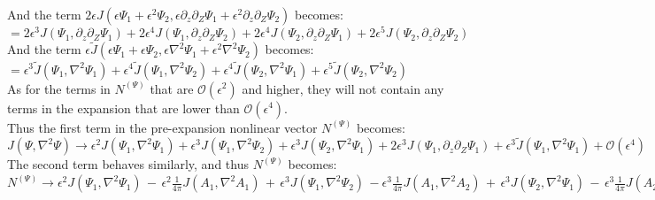 \documentclass[letterpaper,12pt]{article}
\begin{document}
And the term $2\epsilon J(\epsilon\Psi_1 + \epsilon^2\Psi_2, \epsilon\partial_z\partial_Z\Psi_1 + \epsilon^2\partial_z\partial_Z\Psi_2)$ becomes: \\

$= 2\epsilon^3 J(\Psi_1, \partial_z\partial_Z\Psi_1) + 2\epsilon^4 J(\Psi_1, \partial_z\partial_Z\Psi_2) + 2\epsilon^4 J(\Psi_2, \partial_z\partial_Z\Psi_1) + 2\epsilon^5 J(\Psi_2, \partial_z\partial_Z \Psi_2)$ \\

And the term $\epsilon \widetilde{J}(\epsilon\Psi_1 + \epsilon\Psi_2, \epsilon\nabla^2\Psi_1 + \epsilon^2\nabla^2\Psi_2)$ becomes: \\

$= \epsilon^3 \widetilde{J}(\Psi_1, \nabla^2 \Psi_1) + \epsilon^4\widetilde{J}(\Psi_1, \nabla^2\Psi_2) + \epsilon^4\widetilde{J}(\Psi_2, \nabla^2\Psi_1) + \epsilon^5\widetilde{J}(\Psi_2, \nabla^2 \Psi_2)$ \\

As for the terms in $N^{(\Psi)}$ that are $\mathcal{O}(\epsilon^2)$ and higher, they will not contain any terms in the expansion that are lower than $\mathcal{O}(\epsilon^4)$. \\

Thus the first term in the pre-expansion nonlinear vector $N^{(\Psi)}$ becomes: \\

$J(\Psi, \nabla^2\Psi) \to \epsilon^2 J(\Psi_1, \nabla^2 \Psi_1) + \epsilon^3 J(\Psi_1, \nabla^2\Psi_2) + \epsilon^3 J(\Psi_2, \nabla^2\Psi_1) + 2\epsilon^3 J(\Psi_1, \partial_z\partial_Z \Psi_1) + \epsilon^3\widetilde{J}(\Psi_1, \nabla^2 \Psi_1) + \mathcal{O}(\epsilon^4)$ \\

The second term behaves similarly, and thus $N^{(\Psi)}$ becomes: \\

$N^{(\Psi)} \to \epsilon^2 J(\Psi_1, \nabla^2 \Psi_1) \,-\, \epsilon^2 \frac{1}{4\pi}J(A_1, \nabla^2 A_1) \,+\, \epsilon^3 J(\Psi_1, \nabla^2\Psi_2) \, - \epsilon^3\frac{1}{4\pi}J(A_1, \nabla^2 A_2) \,+\, \epsilon^3 J(\Psi_2, \nabla^2\Psi_1) \, - \, \epsilon^3 \frac{1}{4\pi}J(A_2, \nabla^2 A_1) \,+\, 2\epsilon^3 J(\Psi_1, \partial_z\partial_Z \Psi_1) \, - \, 2\epsilon^3 \frac{1}{4\pi}J(A_1, \partial_z\partial_Z A_1) \,+\, \epsilon^3\widetilde{J}(\Psi_1, \nabla^2 \Psi_1) \, - \, \epsilon^3 \frac{1}{4\pi}\widetilde{J}(A_1, \nabla^2 A_1) \, + \, \mathcal{O}(\epsilon^4)$ \\
\end{document}
